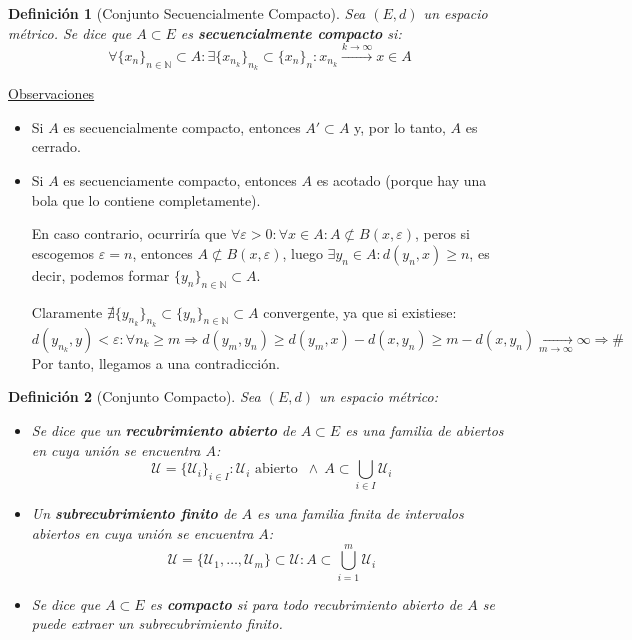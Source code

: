 \documentclass[10pt,a4paper,openright]{book}
\theoremstyle{break}
\newtheorem*{defi}{Definición}
\begin{document}
\begin{defi}[Conjunto Secuencialmente Compacto]
Sea $(E,d)$ un espacio métrico. Se dice que $A \subset E$ es \textbf{secuencialmente compacto} si:
$$\forall \{x_n\}_{n \in \mathbb{N}} \subset A : \exists \{ x_{n_k}\}_{n_k} \subset \{ x_n\}_n : x_{n_{k}}\xrightarrow{k\rightarrow\infty} x \in A$$
\end{defi}

\underline{Observaciones}

\begin{itemize}
\item Si $A$ es secuencialmente compacto, entonces $A' \subset A$ y, por lo tanto,  $A$ es cerrado.

\item Si $A$ es secuenciamente compacto, entonces $A$ es acotado (porque hay una bola que lo contiene completamente). 

En caso contrario, ocurriría que $\forall \varepsilon > 0 : \forall x \in A: A \not\subset B(x,\varepsilon)$, peros si escogemos $\varepsilon = n$, entonces $A\not\subset B(x,\varepsilon)$, luego $\exists y_n \in A : d(y_n,x) \geq n$, es decir, podemos formar $\{y_n\}_{n\in \mathbb{N}}\subset A$.

Claramente $\nexists \{ y_{n_k}\}_{n_k} \subset \{ y_n\}_{n \in \mathbb{N}}\subset A$ convergente, ya que si existiese:
$$d(y_{n_k}, y) < \varepsilon : \forall n_k \geq m \Rightarrow d(y_m, y_n) \geq d(y_m,x) - d(x, y_n) \geq m - d(x, y_n) \xrightarrow[m\rightarrow\infty]{} \infty \Rightarrow \#$$
Por tanto, llegamos a una contradicción.
\end{itemize}


\begin{defi}[Conjunto Compacto]
Sea $(E,d)$ un espacio métrico:
\begin{itemize}
\item Se dice que un \textbf{recubrimiento abierto} de $A \subset E$ es una familia de abiertos en cuya unión se encuentra $A$:
$$\mathcal{U} = \{ \mathcal{U}_i\}_{i \in I} : \mathcal{U}_i \mbox{ abierto } \ \wedge \ A \subset \bigcup_{i \in I} \mathcal{U}_i$$

\item Un \textbf{subrecubrimiento finito} de $A$ es una familia finita de intervalos abiertos en cuya unión se encuentra $A$:
$$\mathcal{U} = \{ \mathcal{U}_1, \ldots, \mathcal{U}_m\} \subset \mathcal{U}: A \subset \bigcup_{i =1}^{m} \mathcal{U}_i$$

\item Se dice que $A \subset E$ es \textbf{compacto} si para todo recubrimiento abierto de $A$ se puede extraer un subrecubrimiento finito.\end{itemize}
\end{defi}
\end{document}
